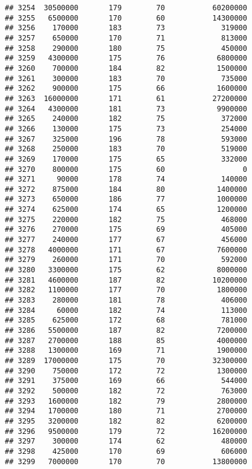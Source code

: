 \documentclass[
]{article}
\begin{document}
\begin{verbatim}
## 3254  30500000       179        70           60200000
## 3255   6500000       170        60           14300000
## 3256    170000       183        73             319000
## 3257    650000       170        71             813000
## 3258    290000       180        75             450000
## 3259   4300000       175        76            6800000
## 3260    700000       184        82            1500000
## 3261    300000       183        70             735000
## 3262    900000       175        66            1600000
## 3263  16000000       171        61           27200000
## 3264   4300000       181        73            9900000
## 3265    240000       182        75             372000
## 3266    130000       175        73             254000
## 3267    325000       196        78             593000
## 3268    250000       183        70             519000
## 3269    170000       175        65             332000
## 3270    800000       175        60                  0
## 3271     90000       178        74             140000
## 3272    875000       184        80            1400000
## 3273    650000       186        77            1000000
## 3274    625000       174        65            1200000
## 3275    220000       182        75             468000
## 3276    270000       175        69             405000
## 3277    240000       177        67             456000
## 3278   4000000       171        67            7600000
## 3279    260000       171        70             592000
## 3280   3300000       175        62            8000000
## 3281   4600000       187        82           10200000
## 3282   1100000       177        70            1800000
## 3283    280000       181        78             406000
## 3284     60000       182        74             113000
## 3285    625000       172        68             781000
## 3286   5500000       187        82            7200000
## 3287   2700000       188        85            4000000
## 3288   1300000       169        71            1900000
## 3289  17000000       175        70           32300000
## 3290    750000       172        72            1300000
## 3291    375000       169        66             544000
## 3292    500000       182        72             763000
## 3293   1600000       182        79            2800000
## 3294   1700000       180        71            2700000
## 3295   3200000       182        82            6200000
## 3296   9500000       179        72           16200000
## 3297    300000       174        62             480000
## 3298    425000       170        69             606000
## 3299   7000000       170        70           13800000

\end{verbatim}
\end{document}
